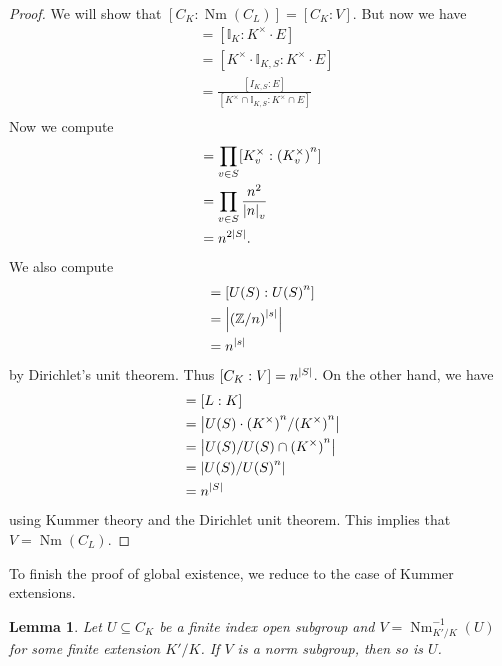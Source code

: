 \documentclass[leqno, openany]{memoir}
\newtheorem{lem}[thm]{Lemma}
\theoremstyle{definition}
\theoremstyle{remark}
\theoremstyle{plain}
\theoremstyle{definition}
\theoremstyle{remark}
\newcommand{\Z}{\mathbb{Z}}
\newcommand{\I}{\mathbb{I}}
\DeclareMathOperator{\Nm}{Nm}
\begin{document}
\begin{proof}
    We will show that $[C_K : \Nm(C_L)] = [C_K : V]$. But now we have
    \begin{align*}
        [C_K:V] &= [\I_K : K^{\times} \cdot E] \\
                &= [K^{\times} \cdot \I_{K,S} : K^{\times} \cdot E] \\
                &= \frac{[I_{K,S} : E]}{[K^{\times} \cap \I_{K,S} : K^{\times} \cap E]} \\
    \end{align*}
    Now we compute
    \begin{align*}
        [\I_{K,S} : E] &= \prod_{v \in S} [K_v^{\times} : {(K_v^{\times})}^n] \\
                       &= \prod_{v \in S} \frac{n^2}{\abs{n}_v} \\
                       &= n^{2 \abs{S}}.
    \end{align*}
    We also compute
    \begin{align*} 
        [K^{\times} \cap \I_{K,S} : K^{\times} \cap E] &= [U(S) : {U(S)}^n] \\
                                                       &= \abs{{(\Z/n)}^{\abs{s}}} \\
                                                       &= n^{\abs{s}}
    \end{align*}
    by Dirichlet's unit theorem. Thus $[C_K : V] = n^{\abs{S}}$. On the other hand, we have
    \begin{align*}
        [C_K : \Nm(C_L)] &= [L:K] \\
                         &= \abs{ U(S) \cdot {(K^{\times})}^n / {(K^{\times})}^n } \\
                         &= \abs{U(S) / U(S) \cap {(K^{\times})}^n} \\
                         &= \abs{U(S) / {U(S)}^n} \\
                         &= n^{\abs{S}}
    \end{align*}
    using Kummer theory and the Dirichlet unit theorem. This implies that $V = \Nm(C_L)$.
\end{proof}

To finish the proof of global existence, we reduce to the case of Kummer extensions.

\begin{lem}
    Let $U \subseteq C_K$ be a finite index open subgroup and $V = \Nm_{K'/K}^{-1}(U)$ for some finite extension $K'/K$. If $V$ is a norm subgroup, then so is $U$.
\end{lem}
\end{document}
